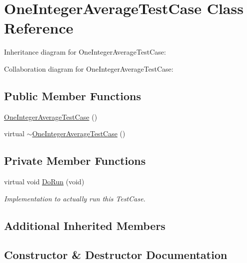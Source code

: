 \hypertarget{classOneIntegerAverageTestCase}{}\section{One\+Integer\+Average\+Test\+Case Class Reference}
\label{classOneIntegerAverageTestCase}


Inheritance diagram for One\+Integer\+Average\+Test\+Case\+:


Collaboration diagram for One\+Integer\+Average\+Test\+Case\+:
\subsection*{Public Member Functions}
\begin{DoxyCompactItemize}
\item 
\hyperlink{classOneIntegerAverageTestCase_ae53bfdd7338c4d190c9107c0acf6e0ce}{One\+Integer\+Average\+Test\+Case} ()
\item 
virtual \hyperlink{classOneIntegerAverageTestCase_acc8e9c74d520d4fecaa3b6c5a91a7f50}{$\sim$\+One\+Integer\+Average\+Test\+Case} ()
\end{DoxyCompactItemize}
\subsection*{Private Member Functions}
\begin{DoxyCompactItemize}
\item 
virtual void \hyperlink{classOneIntegerAverageTestCase_a962250f65e253c4f61890b423f9b2e62}{Do\+Run} (void)
\begin{DoxyCompactList}\small\item\em Implementation to actually run this Test\+Case. \end{DoxyCompactList}\end{DoxyCompactItemize}
\subsection*{Additional Inherited Members}


\subsection{Constructor \& Destructor Documentation}
